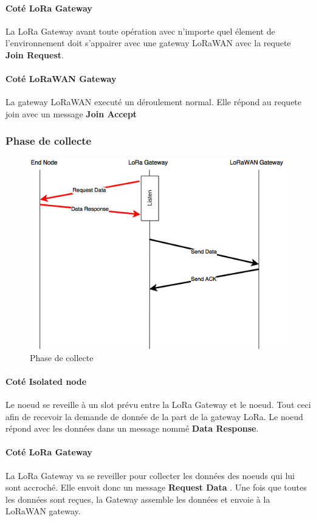 \documentclass[11pt]{article}
\begin{document}
\paragraph{Coté LoRa Gateway}
La LoRa Gateway avant toute opération avec n'importe quel élement de l'environnement doit s'appairer avec une gateway LoRaWAN avec la requete  \textbf{Join Request}.
\paragraph{Coté LoRaWAN Gateway}
La gateway LoRaWAN executé un déroulement normal. Elle répond au requete join avec un message  \textbf{Join Accept}
\newpage
\subsubsection{Phase de collecte}
\begin{figure}[h!]
\centering
\includegraphics[scale=0.6]{Collect.png} 
\caption{Phase de collecte}
\end{figure}

\paragraph{Coté Isolated node} Le noeud se reveille à un slot prévu entre la LoRa Gateway et le noeud. Tout ceci afin de recevoir la demande de donnée de la part de la gateway LoRa. Le noeud répond avec les données dans un message nommé  \textbf{Data Response}.
\paragraph{Coté LoRa Gateway}
La LoRa Gateway va se reveiller pour collecter les données des noeuds qui lui sont accroché. Elle envoit donc un message  \textbf{Request Data} . Une fois que toutes les données sont reçues, la Gateway assemble les données et envoie à la LoRaWAN gateway. 
\end{document}
